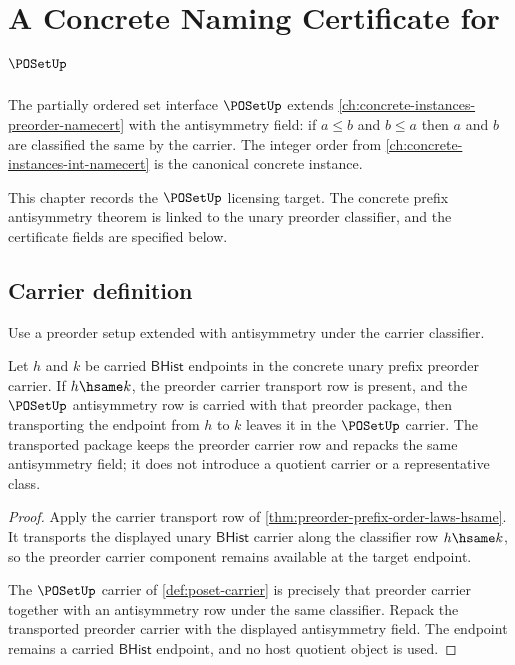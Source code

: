 \chapter{A Concrete Naming Certificate for \(\POSetUp\)}
\label{ch:concrete-instances-poset-namecert}

The partially ordered set interface \(\POSetUp\) extends \autoref{ch:concrete-instances-preorder-namecert} with the antisymmetry field: if \(a \le b\) and \(b \le a\) then \(a\) and \(b\) are classified the same by the carrier. The integer order from \autoref{ch:concrete-instances-int-namecert} is the canonical concrete instance.

\begin{remark}
\label{rem:concrete-instances-poset-namecert-scope}
This chapter records the \(\POSetUp\) licensing target. The concrete prefix
antisymmetry theorem is linked to the unary preorder classifier, and the
certificate fields are specified below.
\end{remark}

\section{Carrier definition}

\begin{definition}
\label{def:poset-carrier}
Use a preorder setup extended with antisymmetry under the carrier classifier.
\end{definition}

\begin{theorem}
\label{thm:poset-bhist-carrier-transport-obligation}
Let $h$ and $k$ be carried $\mathsf{BHist}$ endpoints in the concrete unary
prefix preorder carrier.  If $h\hsame k$, the preorder carrier transport row
is present, and the $\POSetUp$ antisymmetry row is carried with that preorder
package, then transporting the endpoint from $h$ to $k$ leaves it in the
$\POSetUp$ carrier.  The transported package keeps the preorder carrier row
and repacks the same antisymmetry field; it does not introduce a quotient
carrier or a representative class.
\end{theorem}
\begin{proof}
Apply the carrier transport row of
\autoref{thm:preorder-prefix-order-laws-hsame}.  It transports the displayed
unary $\mathsf{BHist}$ carrier along the classifier row $h\hsame k$, so the
preorder carrier component remains available at the target endpoint.

The $\POSetUp$ carrier of \autoref{def:poset-carrier} is precisely that
preorder carrier together with an antisymmetry row under the same classifier.
Repack the transported preorder carrier with the displayed antisymmetry field.
The endpoint remains a carried $\mathsf{BHist}$ endpoint, and no host quotient
object is used.
\end{proof}

